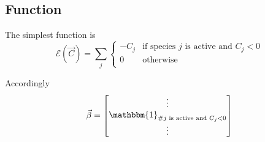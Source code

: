 \documentclass[aps]{revtex4}
\begin{document}
\subsection{Function}
The simplest function is
\begin{equation}
	\mathcal{E}\left(\vec{C}\right) = \sum_j
	\left\lbrace
	\begin{array}{cl}
	-C_j & \text{if species } j \text{ is active and } C_j<0\\
	0    & \text{otherwise}\\
	\end{array}
	\right.
\end{equation}

Accordingly
\begin{equation}
	\vec{\beta} = 
	\begin{bmatrix}
		\vdots\\
		\mathbbm{1}_{\#j \text{ is active and } C_j<0}\\
		\vdots
	\end{bmatrix}
\end{equation}
\end{document}

